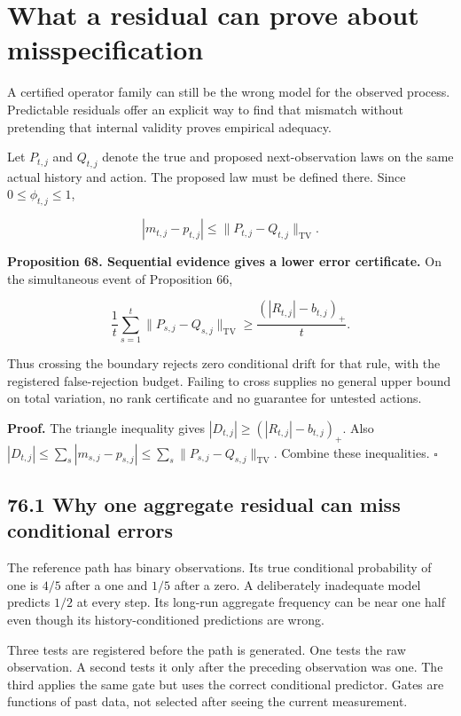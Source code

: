 \section{What a residual can prove about misspecification}\label{LSM:what-a-residual-can-prove-about-misspecification}

A certified operator family can still be the wrong model for the
observed process. Predictable residuals offer an explicit way to find
that mismatch without pretending that internal validity proves empirical
adequacy.

Let \(P_{t,j}\) and \(Q_{t,j}\) denote the true and proposed
next-observation laws on the same actual history and action. The
proposed law must be defined there. Since \(0\leq\phi_{t,j}\leq1\),

\[
|m_{t,j}-p_{t,j}|\leq\|P_{t,j}-Q_{t,j}\|_{\mathrm{TV}}.
\]

\textbf{Proposition 68. Sequential evidence gives a lower error
certificate.} On the simultaneous event of Proposition 66,

\[
\boxed{
\frac1t\sum_{s=1}^t\|P_{s,j}-Q_{s,j}\|_{\mathrm{TV}}
\geq\frac{(|R_{t,j}|-b_{t,j})_+}{t}.
}
\]

Thus crossing the boundary rejects zero conditional drift for that rule,
with the registered false-rejection budget. Failing to cross supplies no
general upper bound on total variation, no rank certificate and no
guarantee for untested actions.

\textbf{Proof.} The triangle inequality gives
\(|D_{t,j}|\geq(|R_{t,j}|-b_{t,j})_+\). Also
\(|D_{t,j}|\leq\sum_s|m_{s,j}-p_{s,j}|\leq\sum_s\|P_{s,j}-Q_{s,j}\|_{\mathrm{TV}}\).
Combine these inequalities. \(\square\)

\subsection{76.1 Why one aggregate residual can miss conditional
errors}\label{LSM:why-one-aggregate-residual-can-miss-conditional-errors}

The reference path has binary observations. Its true conditional
probability of one is \(4/5\) after a one and \(1/5\) after a zero. A
deliberately inadequate model predicts \(1/2\) at every step. Its
long-run aggregate frequency can be near one half even though its
history-conditioned predictions are wrong.

Three tests are registered before the path is generated. One tests the
raw observation. A second tests it only after the preceding observation
was one. The third applies the same gate but uses the correct
conditional predictor. Gates are functions of past data, not selected
after seeing the current measurement.

